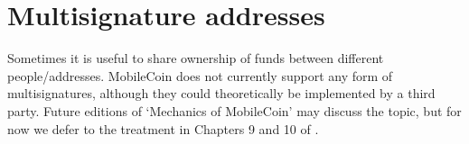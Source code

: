 \section{Multisignature addresses}
\label{sec:multisignature-addresses}

Sometimes it is useful to share ownership of funds between different people/addresses. MobileCoin does not currently support any form of multisignatures, although they could theoretically be implemented by a third party. Future editions of `Mechanics of MobileCoin' may discuss the topic, but for now we defer to the treatment in Chapters 9 and 10 of \cite{ztm-2}.